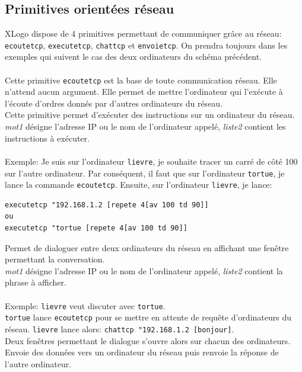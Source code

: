 \subsection{Primitives orientées réseau} 
XLogo dispose de 4 primitives permettant de communiquer grâce au réseau: \texttt{ecoutetcp}, \texttt{executetcp}, \texttt{chattcp} et \texttt{envoietcp}. On prendra toujours dans les exemples qui suivent le cas des deux ordinateurs du schéma précédent.\\ \\
Cette primitive \texttt{ecoutetcp} est la base de toute communication réseau. Elle n'attend aucun argument. Elle permet de mettre l'ordinateur qui l'exécute à l'écoute d'ordres donnés par d'autres ordinateurs du réseau. \\
Cette primitive permet d'exécuter des instructions sur un ordinateur du réseau.\\
\textit{mot1} désigne l'adresse IP ou le nom de l'ordinateur appelé, \textit{liste2} contient les instructions à exécuter.\\ \\
Exemple: Je suis sur l'ordinateur \texttt{lievre}, je souhaite tracer un carré de côté 100 sur l'autre ordinateur.  Par conséquent, il faut que sur l'ordinateur \texttt{tortue}, je lance la commande \texttt{ecoutetcp}. Ensuite, sur l'ordinateur \texttt{lievre}, je lance:
\begin{verbatim}
executetcp "192.168.1.2 [repete 4[av 100 td 90]]
ou 
executetcp "tortue [repete 4[av 100 td 90]]
\end{verbatim}
\noindent {}
Permet de dialoguer entre deux ordinateurs du réseau en affichant une fenêtre permettant la conversation.\\
\textit{mot1} désigne l'adresse IP ou le nom de l'ordinateur appelé, \textit{liste2} contient la phrase à afficher.\\ \\
Exemple: \texttt{lievre} veut discuter avec \texttt{tortue}.\\
\texttt{tortue} lance \texttt{ecoutetcp} pour se mettre en attente de requête d'ordinateurs du réseau. \texttt{lievre} lance alors: \texttt{chattcp~"192.168.1.2~[bonjour]}.\\
Deux fenêtres permettant le dialogue s'ouvre alors sur chacun des ordinateurs.\\
Envoie des données vers un ordinateur du réseau puis renvoie la réponse de l'autre ordinateur.\\
